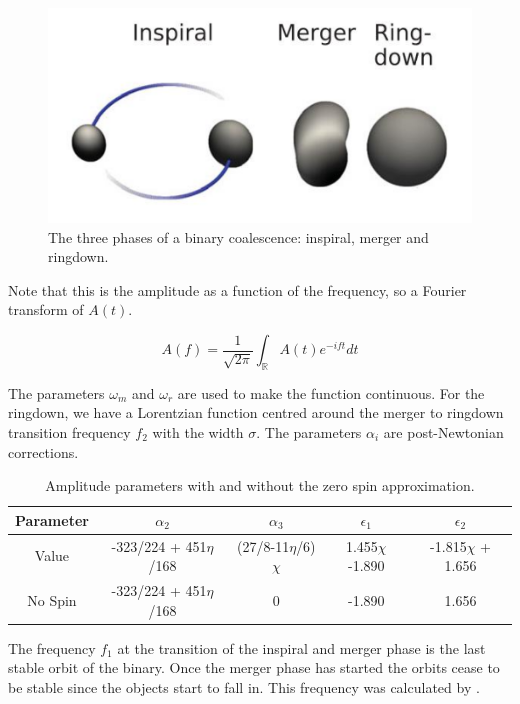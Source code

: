 \begin{figure}
    \centering
    \includegraphics[width=0.5\linewidth]{Images/IMR_figure.png}
    \caption{The three phases of a binary coalescence: inspiral, merger and ringdown.}
    \label{IMR_figure}
\end{figure} 

Note that this is the amplitude as a function of the frequency, so a Fourier transform of $A(t)$.

\begin{equation}
    A(f) =  \frac{1}{\sqrt{2\pi}}\int_\mathbb{R} A(t) e^{-ift} dt
\end{equation}

The parameters $\omega_m$ and $\omega_r$ are used to make the function continuous. For the ringdown, we have a Lorentzian function centred around the merger to ringdown transition frequency $f_2$ with the width $\sigma$. The parameters $\alpha_i$ are post-Newtonian corrections.

\begin{table}[h]
    \begin{center}
        \begin{tabular}{ c | c | c | c | c}
            Parameter & $\alpha_2$ & $\alpha_3$ & $\epsilon_1$ & $\epsilon_2$ \\
            \hline
            Value & -323/224 + 451$\eta$/168 & (27/8-11$\eta$/6)$\chi$ & 1.455$\chi$-1.890 & -1.815$\chi$ + 1.656\\
            \hline
            No Spin & -323/224 +  451$\eta$/168 & 0 & -1.890 & 1.656 
        \end{tabular}
        \caption{Amplitude parameters with and without the zero spin approximation.}
        \label{amplitude_param}
    \end{center}
\end{table}

The frequency $f_1$ at the transition of the inspiral and merger phase is the last stable orbit of the binary. Once the merger phase has started the orbits cease to be stable since the objects start to fall in. This frequency was calculated by \cite{bardeen_rotating_1972}.

